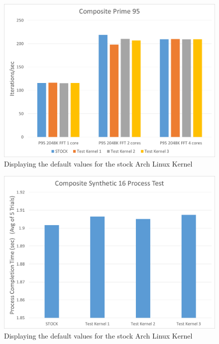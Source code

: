 \begin{figure}[hb]
	\includegraphics[width=1.0\columnwidth]{images/CompositeP95}
	\caption{Displaying the default values for the stock Arch Linux Kernel}
\end{figure}

\begin{figure}[hb]
	\includegraphics[width=1.0\columnwidth]{images/CompositeSynthetic}
	\caption{Displaying the default values for the stock Arch Linux Kernel}
\end{figure}